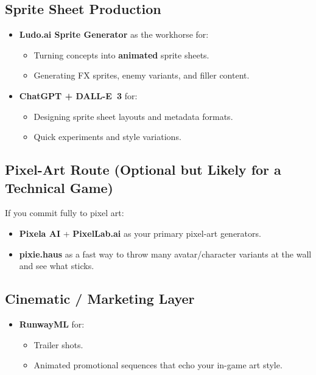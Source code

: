 \documentclass[11pt]{article}
\begin{document}
\subsection{Sprite Sheet Production}

\begin{itemize}
    \item \textbf{Ludo.ai Sprite Generator} as the workhorse for:
    \begin{itemize}
        \item Turning concepts into \textbf{animated} sprite sheets.
        \item Generating FX sprites, enemy variants, and filler content.
    \end{itemize}
    \item \textbf{ChatGPT + DALL-E~3} for:
    \begin{itemize}
        \item Designing sprite sheet layouts and metadata formats.
        \item Quick experiments and style variations.
    \end{itemize}
\end{itemize}

\subsection{Pixel-Art Route (Optional but Likely for a Technical Game)}

If you commit fully to pixel art:

\begin{itemize}
    \item \textbf{Pixela AI} + \textbf{PixelLab.ai} as your primary pixel-art generators.
    \item \textbf{pixie.haus} as a fast way to throw many avatar/character variants at the wall and see what sticks.
\end{itemize}

\subsection{Cinematic / Marketing Layer}

\begin{itemize}
    \item \textbf{RunwayML} for:
    \begin{itemize}
        \item Trailer shots.
        \item Animated promotional sequences that echo your in-game art style.
    \end{itemize}
\end{itemize}
\end{document}
